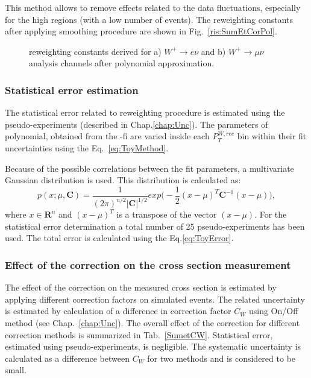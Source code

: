 This method allows to remove effects related to the data fluctuations, especially for the high \sumet regions (with a low number of events). The reweighting constants after applying smoothing procedure are shown in Fig.~\ref{ris:SumEtCorPol}. 

\begin{figure}[!tbp]
\begin{minipage}[h]{0.49\linewidth}
\end{minipage}
\hfill
\begin{minipage}[h]{0.49\linewidth}
\end{minipage}
\caption{\sumet reweighting constants derived for a) $W^{+} \to e \nu$ and b) $W^{+} \to \mu \nu$ analysis channels after polynomial approximation.}
\end{figure}

\subsubsection{Statistical error estimation}

The statistical error related to \sumet reweighting procedure is estimated using the pseudo-experiments (described in Chap.\ref{chap:Unc}). The parameters of polynomial, obtained from the \chiD-fi are varied inside each $P_T^{W, rec}$ bin within their fit uncertainties using the Eq.~\ref{eq:ToyMethod}. 

Because of the possible correlations between the fit parameters, a multivariate Gaussian distribution is used. This distribution is calculated as:
\begin{equation}
p(x;\mu, \mathbf{C}) =\frac{1}{(2\pi)^{n/2}|\mathbf{C}|^{1/2}} exp\Big(-\frac{1}{2}(x-\mu)^{T}\mathbf{C}^{-1}(x-\mu)\Big),
\end{equation}
where $x \in \boldsymbol{R}^{n}$ and $(x-\mu)^{T}$ is a transpose of the vector $(x-\mu)$. For the statistical error determination a total number of 25 pseudo-experiments has been used. The total error is calculated using the Eq.\ref{eq:ToyError}.

\subsubsection{Effect of the \sumet correction on the cross section measurement}
The effect of the \sumet correction on the measured cross section is estimated by applying different correction factors on simulated events. The related uncertainty is estimated by calculation of a difference in correction factor $C_{W}$ using On/Off method (see Chap.~\ref{chap:Unc}). The overall effect of the \sumet correction for different correction methods is summarized in Tab.~\ref{SumetCW}. Statistical error, estimated using pseudo-experiments, is negligible. The systematic uncertainty is calculated as a difference between $C_{W}$ for two methods and is considered to be small. 

